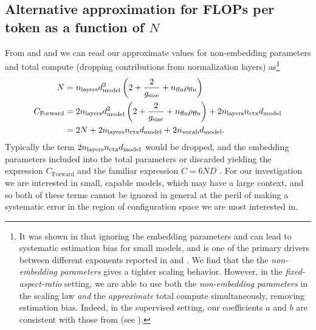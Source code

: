 \subsection{Alternative approximation for FLOPs per token as a function of \texorpdfstring{$N$}{N}}
\label{ssec:alternative-approximation-for-flops-per-token-as-a-function-of-n}

From  and 
and
we can read our approximate values for non-embedding parameters and total compute (dropping contributions from normalization layers) as\footnote{It was shown in \citet{DBLP:journals/corr/abs-2406-19146} that ignoring the embedding parameters and \flops can lead to systematic estimation bias for small models, and is one of the primary drivers between different exponents reported in \citet{DBLP:journals/corr/abs-2001-08361} and \citet{DBLP:journals/corr/abs-2203-15556}.
We find that the the \emph{non-embedding parameters} gives a tighter scaling behavior.
However, in the \emph{fixed-aspect-ratio} setting, we are able to use both the
\emph{non-embedding parameters} in the scaling law \emph{and} the \emph{approximate} total compute simultaneously, removing estimation bias.
Indeed, in the supervised setting, our coefficients $a$ and $b$ are consistent with those from \citet{DBLP:journals/corr/abs-2203-15556} (see ).}
\begin{align}
	N                & =n_\text{layers}d_\text{model}^2\left(2+ \frac2{g_{\text{size}}} + n_\text{ffn}\rho_{\text{ffn}}\right) \\
	C_\text{Forward} & =
	2n_\text{layers}d_\text{model}^2\left(2+ \frac2{g_{\text{size}}} + n_\text{ffn}\rho_{\text{ffn}}\right)
	+2n_\text{layers}n_\text{ctx}d_\text{model}                                                         \\
	                 & =
	2N
	+2n_\text{layers}n_\text{ctx}d_\text{model}
    +2n_\text{vocab}d_\text{model}.
	\label{eq:c-forward-as-n}
\end{align}
Typically the term $2n_\text{layers}n_\text{ctx}d_\text{model}$ would be dropped, and the embedding parameters included into the total parameters \citep{DBLP:journals/corr/abs-2203-15556}
or discarded \citep{DBLP:journals/corr/abs-2001-08361}
yielding the expression $C_\text{Forward}$ and the familiar expression $C=6ND$ \citep{DBLP:journals/corr/abs-2001-08361,DBLP:journals/corr/abs-2203-15556}.
For our investigation we are interested in small, capable models, which may have a large context,
and so both of these terms cannot be ignored in general at the peril of making a systematic error in the region of configuration space we are most interested in.
